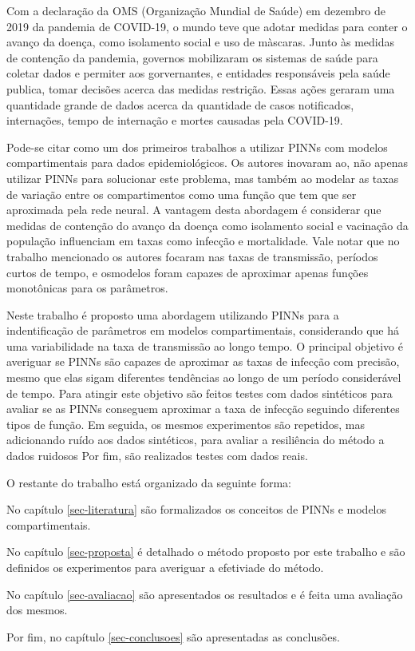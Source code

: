 Com a declaração da OMS (Organização Mundial de Saúde) em dezembro de 2019 da
pandemia de COVID-19, o mundo teve que adotar medidas para conter o avanço da 
doença, como isolamento social e uso de màscaras. Junto às medidas de contenção
da pandemia, governos mobilizaram os sistemas de saúde para coletar dados
e permiter aos gorvernantes, e entidades responsáveis pela saúde publica, 
tomar decisões acerca das medidas restrição.  
Essas ações geraram uma quantidade grande de dados acerca da quantidade de casos
notificados, internações, tempo de internação e mortes causadas pela COVID-19. 

Pode-se citar \cite{long-etal:21-L2} como um dos primeiros trabalhos a utilizar
PINNs com modelos compartimentais para dados epidemiológicos. Os autores inovaram 
ao, não apenas utilizar PINNs para solucionar este problema, mas também ao modelar 
as taxas de variação entre os compartimentos como uma função que tem que ser
aproximada pela rede neural. A vantagem desta abordagem é considerar que medidas
de contenção do avanço da doença como isolamento social e vacinação da população
influenciam em taxas como infecção e mortalidade. Vale notar que no trabalho
mencionado os autores focaram nas taxas de transmissão, períodos curtos de tempo,
e osmodelos foram capazes de aproximar apenas funções monotônicas para os parâmetros.   

Neste trabalho é proposto uma abordagem utilizando PINNs para a indentificação 
de parâmetros em modelos compartimentais, considerando que há uma variabilidade
na taxa de transmissão ao longo tempo. O principal objetivo é averiguar se PINNs
são capazes de aproximar as taxas de infecção com precisão, mesmo que elas  
sigam diferentes tendências ao longo de um período considerável de tempo.
Para atingir este objetivo são feitos testes com dados sintéticos para avaliar
se as PINNs conseguem aproximar a taxa de infecção seguindo diferentes tipos de
função. 
Em seguida, os mesmos experimentos são repetidos, mas adicionando ruído aos
dados sintéticos, para avaliar a resiliência do método a dados ruidosos
Por fim, são realizados testes com dados reais.

O restante do trabalho está organizado da seguinte forma: 

No capítulo \ref{sec-literatura} são formalizados os conceitos de PINNs 
e modelos compartimentais. 

No capítulo \ref{sec-proposta} é detalhado o método proposto por este 
trabalho e são definidos os experimentos para averiguar a efetiviade
do método. 

No capítulo \ref{sec-avaliacao} são apresentados os resultados e 
é feita uma avaliação dos mesmos.

Por fim, no capítulo \ref{sec-conclusoes} são apresentadas as conclusões.    